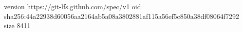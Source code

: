 version https://git-lfs.github.com/spec/v1
oid sha256:44a22938d60056aa2164ab5a08a3802881af115a56ef5c850a38df08064f7292
size 8411
